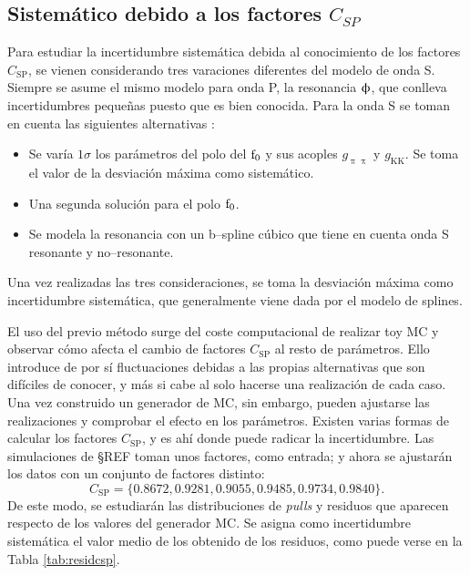 \subsection{Sistemático debido a los factores $C_{SP}$}

Para estudiar la incertidumbre sistemática debida al conocimiento de los factores $C_{\text{SP}}$, se vienen considerando tres varaciones diferentes del modelo de onda S. Siempre se asume el mismo modelo para onda P, la resonancia $\upphi$, que conlleva incertidumbres pequeñas puesto que es bien conocida. Para la onda S se toman en cuenta las siguientes alternativas \cite{paperPhis}:
\begin{itemize}
  \item Se varía $1 \sigma$ los parámetros del polo del $\text{f}_0$ y sus acoples $g_{\uppi \uppi}$ y $g_{\text{KK}}$. Se toma el valor de la desviación máxima como sistemático.
  \item Una segunda solución para el polo $\text{f}_0$.
  \item Se modela la resonancia con un b--spline cúbico que tiene en cuenta onda S resonante y no--resonante.
\end{itemize}
Una vez realizadas las tres consideraciones, se toma la desviación máxima como incertidumbre sistemática, que generalmente viene dada por el modelo de splines.

El uso del previo método surge del coste computacional de realizar toy MC y observar cómo afecta el cambio de factores $C_{\text{SP}}$ al resto de parámetros. Ello introduce de por sí fluctuaciones debidas a las propias alternativas que son difíciles de conocer, y más si cabe al solo hacerse una realización de cada caso. Una vez construido un generador de MC, sin embargo, pueden ajustarse las realizaciones y comprobar el efecto en los parámetros.
Existen varias formas de calcular los factores $C_{\text{SP}}$, y es ahí donde puede radicar la incertidumbre. Las simulaciones de \S REF toman unos factores, como entrada; y ahora se ajustarán los datos con un conjunto de factores distinto:
\[C_{\text{SP}} = \{0.8672, 0.9281, 0.9055, 0.9485, 0.9734, 0.9840 \}.\]
De este modo, se estudiarán las distribuciones de \textit{pulls} y residuos que aparecen respecto de los valores del generador MC. Se asigna como incertidumbre sistemática el valor medio de los obtenido de los residuos, como puede verse en la Tabla \ref{tab:residcsp}.


